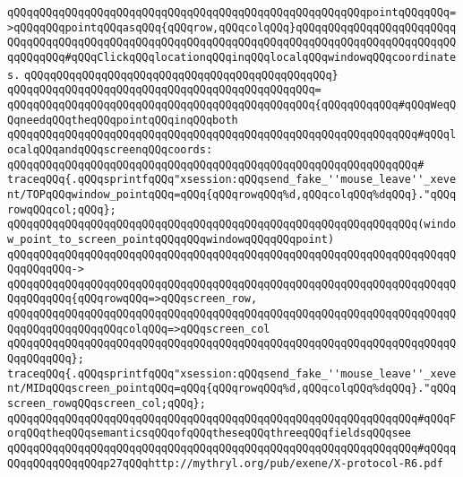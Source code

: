 \verb|qQQqqQQqqQQqqQQqqQQqqQQqqQQqqQQqqQQqqQQqqQQqqQQqqQQqqQQqpointqQQqqQQq=>qQQqqQQqpointqQQqasqQQq{qQQqrow,qQQqcolqQQq}qQQqqQQqqQQqqQQqqQQqqQQqqQQqqQQqqQQqqQQqqQQqqQQqqQQqqQQqqQQqqQQqqQQqqQQqqQQqqQQqqQQqqQQqqQQqqQQqqQQqqQQq#qQQqClickqQQqlocationqQQqinqQQqlocalqQQqwindowqQQqcoordinates.|\newline
\verb|qQQqqQQqqQQqqQQqqQQqqQQqqQQqqQQqqQQqqQQqqQQqqQQq}|\newline
\verb|qQQqqQQqqQQqqQQqqQQqqQQqqQQqqQQqqQQqqQQqqQQqqQQq=|\newline
\verb|qQQqqQQqqQQqqQQqqQQqqQQqqQQqqQQqqQQqqQQqqQQqqQQq{qQQqqQQqqQQq#qQQqWeqQQqneedqQQqtheqQQqpointqQQqinqQQqboth|\newline
\verb|qQQqqQQqqQQqqQQqqQQqqQQqqQQqqQQqqQQqqQQqqQQqqQQqqQQqqQQqqQQqqQQq#qQQqlocalqQQqandqQQqscreenqQQqcoords:|\newline
\verb|qQQqqQQqqQQqqQQqqQQqqQQqqQQqqQQqqQQqqQQqqQQqqQQqqQQqqQQqqQQqqQQq#|\newline
\verb|traceqQQq{.qQQqsprintfqQQq"xsession:qQQqsend_fake_''mouse_leave''_xevent/TOPqQQqwindow_pointqQQq=qQQq{qQQqrowqQQq%d,qQQqcolqQQq%dqQQq}."qQQqrowqQQqcol;qQQq};|\newline
\verb|qQQqqQQqqQQqqQQqqQQqqQQqqQQqqQQqqQQqqQQqqQQqqQQqqQQqqQQqqQQqqQQq(window_point_to_screen_pointqQQqqQQqwindowqQQqqQQqpoint)|\newline
\verb|qQQqqQQqqQQqqQQqqQQqqQQqqQQqqQQqqQQqqQQqqQQqqQQqqQQqqQQqqQQqqQQqqQQqqQQqqQQqqQQq->|\newline
\verb|qQQqqQQqqQQqqQQqqQQqqQQqqQQqqQQqqQQqqQQqqQQqqQQqqQQqqQQqqQQqqQQqqQQqqQQqqQQqqQQq{qQQqrowqQQq=>qQQqscreen_row,|\newline
\verb|qQQqqQQqqQQqqQQqqQQqqQQqqQQqqQQqqQQqqQQqqQQqqQQqqQQqqQQqqQQqqQQqqQQqqQQqqQQqqQQqqQQqqQQqcolqQQq=>qQQqscreen_col|\newline
\verb|qQQqqQQqqQQqqQQqqQQqqQQqqQQqqQQqqQQqqQQqqQQqqQQqqQQqqQQqqQQqqQQqqQQqqQQqqQQqqQQq};|\newline
\newline
\verb|traceqQQq{.qQQqsprintfqQQq"xsession:qQQqsend_fake_''mouse_leave''_xevent/MIDqQQqscreen_pointqQQq=qQQq{qQQqrowqQQq%d,qQQqcolqQQq%dqQQq}."qQQqscreen_rowqQQqscreen_col;qQQq};|\newline
\verb|qQQqqQQqqQQqqQQqqQQqqQQqqQQqqQQqqQQqqQQqqQQqqQQqqQQqqQQqqQQqqQQq#qQQqForqQQqtheqQQqsemanticsqQQqofqQQqtheseqQQqthreeqQQqfieldsqQQqsee|\newline
\verb|qQQqqQQqqQQqqQQqqQQqqQQqqQQqqQQqqQQqqQQqqQQqqQQqqQQqqQQqqQQqqQQq#qQQqqQQqqQQqqQQqqQQqp27qQQqhttp://mythryl.org/pub/exene/X-protocol-R6.pdf|\newline
